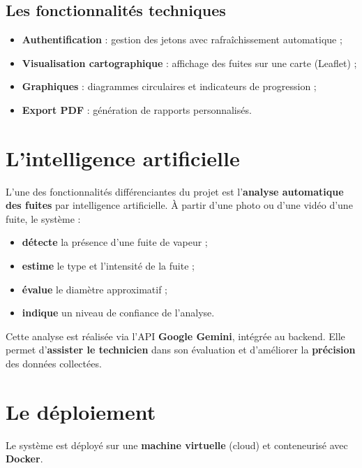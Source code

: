 \documentclass[12pt,a4paper,oneside]{report}
\begin{document}
\subsection{Les fonctionnalités techniques}

\begin{itemize}
    \item \textbf{Authentification} : gestion des jetons avec rafraîchissement automatique ;
    \item \textbf{Visualisation cartographique} : affichage des fuites sur une carte (Leaflet) ;
    \item \textbf{Graphiques} : diagrammes circulaires et indicateurs de progression ;
    \item \textbf{Export PDF} : génération de rapports personnalisés.
\end{itemize}

\section{L'intelligence artificielle}

L'une des fonctionnalités différenciantes du projet est l'\textbf{analyse automatique des fuites} par intelligence artificielle. À partir d'une photo ou d'une vidéo d'une fuite, le système :
\begin{itemize}
    \item \textbf{détecte} la présence d'une fuite de vapeur ;
    \item \textbf{estime} le type et l'intensité de la fuite ;
    \item \textbf{évalue} le diamètre approximatif ;
    \item \textbf{indique} un niveau de confiance de l'analyse.
\end{itemize}

Cette analyse est réalisée via l'API \textbf{Google Gemini}, intégrée au backend. Elle permet d'\textbf{assister le technicien} dans son évaluation et d'améliorer la \textbf{précision} des données collectées.

\section{Le déploiement}

Le système est déployé sur une \textbf{machine virtuelle} (cloud) et conteneurisé avec \textbf{Docker}.
\end{document}
